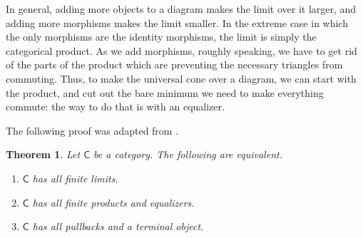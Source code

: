 \documentclass[a4paper,10pt]{scrreprt}
\theoremstyle{definition}
\theoremstyle{plain}
\newtheorem{theorem}{Theorem}[section]
\theoremstyle{remark}
\begin{document}
In general, adding more objects to a diagram makes the limit over it larger, and adding more morphisms makes the limit smaller. In the extreme case in which the only morphisms are the identity morphisms, the limit is simply the categorical product. As we add morphisms, roughly speaking, we have to get rid of the parts of the product which are preventing the necessary triangles from commuting. Thus, to make the universal cone over a diagram, we can start with the product, and cut out the bare minimum we need to make everything commute: the way to do that is with an equalizer.

The following proof was adapted from \cite{awodey-category-theory}. 
\begin{theorem}
  \label{thm:criterionforfinitelimits}
  Let $\mathsf{C}$ be a category. The following are equivalent.
  \begin{enumerate}
    \item $\mathsf{C}$ has all finite limits.
    \item $\mathsf{C}$ has all finite products and equalizers.
    \item $\mathsf{C}$ has all pullbacks and a terminal object.
  \end{enumerate}
\end{theorem}
\end{document}
